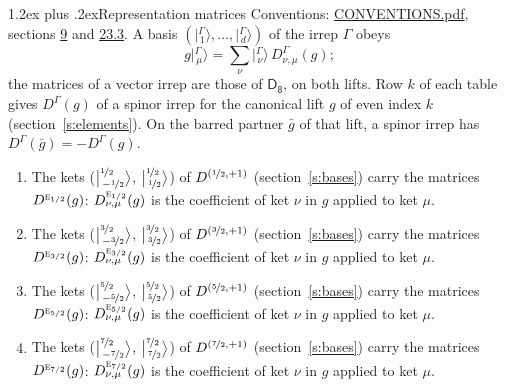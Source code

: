 \documentclass[10pt,a4paper]{article}
\makeatletter
\renewcommand\section{\@startsection{section}{1}{\z@}{-3ex plus -1ex minus -.2ex}%
  {1.2ex plus .2ex}{\normalfont\large\sffamily\bfseries\color{parttitle}}}
\numberwithin{equation}{section}
\newcommand{\grp}[1]{\mathsf{#1}}
\newcommand{\irr}[1]{\text{\normalfont\scshape #1}}
\newcommand{\irrJp}[2]{D^{(#1,#2)}}
\newcommand{\repD}[1]{D^{#1}}
\newcommand{\intx}{\mu}
\newcommand{\jm}[2]{\bigl\lvert{}^{#1}_{\,#2}\bigr\rangle}
\newcommand{\irket}[2]{\bigl\lvert{}^{#1}_{\,#2}\bigr\rangle}
\newcommand{\barred}[1]{\bar{#1}}
\newenvironment{romanlist}{\begin{enumerate}%
\renewcommand{\labelenumi}{(\roman{enumi})}}%
  {\end{enumerate}}
\makeatother
\begin{document}
\section{Representation matrices}\label{s:irrep_matrices}
Conventions: \href{../../CONVENTIONS.pdf}{CONVENTIONS.pdf}, sections \href{../../../rotation/CONVENTIONS.pdf\#conv.9}{9} and \href{../../CONVENTIONS.pdf\#conv.23.3}{23.3}.
\leavevmode\label{n:vector.ket.partner}\label{n:index.partner}\label{n:matrix.irrep}\label{n:index.partner.summed}A basis $(\irket{\Gamma}{1}, \dots, \irket{\Gamma}{d})$ of the irrep $\Gamma$ obeys
\begin{equation}\label{e:partner}g\irket{\Gamma}{\intx} = \sum_\nu \irket{\Gamma}{\nu}\, \repD{\Gamma}_{\nu,\intx}(g);\end{equation}
the matrices of a vector irrep are those of \href{../../../rotation/data/pdf/D8.pdf}{$\grp{D_{8}}$}, on both lifts. Row $k$ of each table gives $\repD{\Gamma}(g)$ of a spinor irrep for the canonical lift $g$ of even index $k$ (section~\ref{s:elements}). On the barred partner $\barred{g}$ of that lift, a spinor irrep has $\repD{\Gamma}(\barred{g}) = -\repD{\Gamma}(g)$.
\begin{romanlist}\raggedright
\item The kets ($\jm{\nicefrac{1}{2}}{-\nicefrac{1}{2}}$, $\jm{\nicefrac{1}{2}}{\nicefrac{1}{2}}$) of $\irrJp{\nicefrac{1}{2}}{+1}$ (section~\ref{s:bases}) carry the matrices $\repD{\irr{e}_{1/2}}(g)$: $\repD{\irr{e}_{1/2}}_{\nu,\intx}(g)$ is the coefficient of ket $\nu$ in $g$ applied to ket $\intx$.
\item The kets ($\jm{\nicefrac{3}{2}}{-\nicefrac{3}{2}}$, $\jm{\nicefrac{3}{2}}{\nicefrac{3}{2}}$) of $\irrJp{\nicefrac{3}{2}}{+1}$ (section~\ref{s:bases}) carry the matrices $\repD{\irr{e}_{3/2}}(g)$: $\repD{\irr{e}_{3/2}}_{\nu,\intx}(g)$ is the coefficient of ket $\nu$ in $g$ applied to ket $\intx$.
\item The kets ($\jm{\nicefrac{5}{2}}{-\nicefrac{5}{2}}$, $\jm{\nicefrac{5}{2}}{\nicefrac{5}{2}}$) of $\irrJp{\nicefrac{5}{2}}{+1}$ (section~\ref{s:bases}) carry the matrices $\repD{\irr{e}_{5/2}}(g)$: $\repD{\irr{e}_{5/2}}_{\nu,\intx}(g)$ is the coefficient of ket $\nu$ in $g$ applied to ket $\intx$.
\item The kets ($\jm{\nicefrac{7}{2}}{-\nicefrac{7}{2}}$, $\jm{\nicefrac{7}{2}}{\nicefrac{7}{2}}$) of $\irrJp{\nicefrac{7}{2}}{+1}$ (section~\ref{s:bases}) carry the matrices $\repD{\irr{e}_{7/2}}(g)$: $\repD{\irr{e}_{7/2}}_{\nu,\intx}(g)$ is the coefficient of ket $\nu$ in $g$ applied to ket $\intx$.
\end{romanlist}
\end{document}
